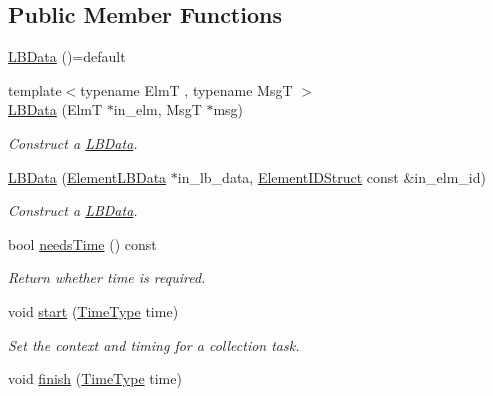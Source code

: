 \subsection*{Public Member Functions}
\begin{DoxyCompactItemize}
\item 
\hyperlink{structvt_1_1ctx_1_1_l_b_data_a2df28bac4813faec6857a0df13692e09}{L\+B\+Data} ()=default
\item 
{\footnotesize template$<$typename ElmT , typename MsgT $>$ }\\\hyperlink{structvt_1_1ctx_1_1_l_b_data_aeee7259db248f19afcc19179c1a623ba}{L\+B\+Data} (ElmT $\ast$in\+\_\+elm, MsgT $\ast$msg)
\begin{DoxyCompactList}\small\item\em Construct a {\ttfamily \hyperlink{structvt_1_1ctx_1_1_l_b_data}{L\+B\+Data}}. \end{DoxyCompactList}\item 
\hyperlink{structvt_1_1ctx_1_1_l_b_data_ac049bfde4cc4820b5e065e1626284b09}{L\+B\+Data} (\hyperlink{structvt_1_1ctx_1_1_l_b_data_a11f1aeb75c01ae0c77d96f94ce1994bb}{Element\+L\+B\+Data} $\ast$in\+\_\+lb\+\_\+data, \hyperlink{structvt_1_1ctx_1_1_l_b_data_aad9fac05c3faf80173b273d900db6fb1}{Element\+I\+D\+Struct} const \&in\+\_\+elm\+\_\+id)
\begin{DoxyCompactList}\small\item\em Construct a {\ttfamily \hyperlink{structvt_1_1ctx_1_1_l_b_data}{L\+B\+Data}}. \end{DoxyCompactList}\item 
bool \hyperlink{structvt_1_1ctx_1_1_l_b_data_ae4a5cbc3f4f0d9aedf635ee57039a44d}{needs\+Time} () const
\begin{DoxyCompactList}\small\item\em Return whether time is required. \end{DoxyCompactList}\item 
void \hyperlink{structvt_1_1ctx_1_1_l_b_data_afe13a3a388d93f3023c15fc83c693093}{start} (\hyperlink{namespacevt_a876a9d0cd5a952859c72de8a46881442}{Time\+Type} time)
\begin{DoxyCompactList}\small\item\em Set the context and timing for a collection task. \end{DoxyCompactList}\item 
void \hyperlink{structvt_1_1ctx_1_1_l_b_data_a696a50d1d38f3bf436e9afb80f606711}{finish} (\hyperlink{namespacevt_a876a9d0cd5a952859c72de8a46881442}{Time\+Type} time)

\end{DoxyCompactItemize}
